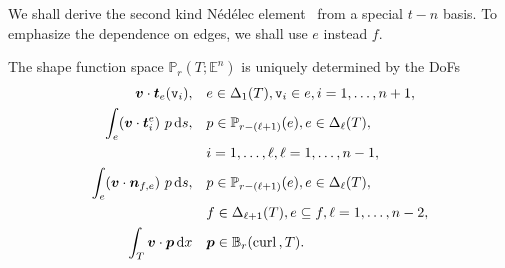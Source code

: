 \documentclass[10pt]{amsart}
\begin{document}
We shall derive the second kind N\'ed\'elec element~\cite{Nedelec1986} from a special $t-n$ basis. To emphasize the dependence on edges, we shall use $e$ instead $f$. 

\begin{lemma}\label{lm:localNedelec}
The shape function space $\mathbb P_r(T; \mathbb E^n)$ is uniquely determined by the DoFs
\begin{align}
\label{eq:vecbdDoF0}
\boldsymbol v\cdot \boldsymbol t_{e}(\texttt{v}_i), & \quad e\in \Delta_{1}(T), \texttt{v}_i\in e,  i=1,\ldots, n+1, \\
\label{eq:vecbdDoF1}
\int_e (\boldsymbol v\cdot \boldsymbol t_i^e)\ p \,{\rm d} s, &\quad  p\in \mathbb P_{r - (\ell +1)} (e), e\in \Delta_{\ell}(T),\\
& \quad  i=1,\ldots, \ell, \ell = 1,\ldots, n-1, \notag\\
\label{eq:vecbdDoF2}
\int_e (\boldsymbol v\cdot \boldsymbol n_{f,e})\ p \,{\rm d} s, &\quad  p\in \mathbb P_{r - (\ell +1)} (e),e\in \Delta_{\ell}(T), \\
& \quad f\in \Delta_{\ell+1}(T), e\subseteq f, \ell = 1,\ldots, n-2, \notag\\
\int_T \boldsymbol v \cdot \boldsymbol p \,{\rm d}x&\quad \boldsymbol p\in \mathbb B_r({\rm curl\,}, T). \label{eq:bubbleDoF}
\end{align}
\end{lemma}
\end{document}
